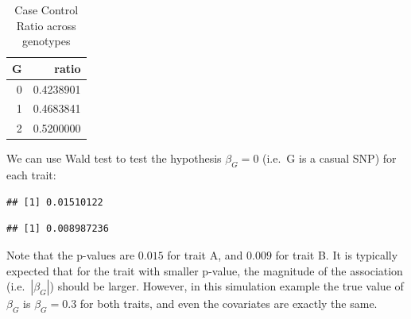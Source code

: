 \documentclass[
]{article}
\newenvironment{Shaded}{\begin{snugshade}}{\end{snugshade}}
\newcommand{\AttributeTok}[1]{\textcolor[rgb]{0.77,0.63,0.00}{#1}}
\newcommand{\DecValTok}[1]{\textcolor[rgb]{0.00,0.00,0.81}{#1}}
\newcommand{\DocumentationTok}[1]{\textcolor[rgb]{0.56,0.35,0.01}{\textbf{\textit{#1}}}}
\newcommand{\FunctionTok}[1]{\textcolor[rgb]{0.00,0.00,0.00}{#1}}
\newcommand{\NormalTok}[1]{#1}
\newcommand{\OtherTok}[1]{\textcolor[rgb]{0.56,0.35,0.01}{#1}}
\newcommand{\SpecialCharTok}[1]{\textcolor[rgb]{0.00,0.00,0.00}{#1}}
\newcommand{\StringTok}[1]{\textcolor[rgb]{0.31,0.60,0.02}{#1}}
\begin{document}
\begin{table}[H]

\caption{\label{tab:simulatedData}Case Control Ratio across genotypes}
\centering
\fontsize{10}{12}\selectfont
\begin{tabular}[t]{r|r}
\hline
G & ratio\\
\hline
0 & 0.4238901\\
\hline
1 & 0.4683841\\
\hline
2 & 0.5200000\\
\hline
\end{tabular}
\end{table}

We can use Wald test to test the hypothesis \(\beta_G = 0\) (i.e.~G is a
casual SNP) for each trait:

\begin{Shaded}
\end{Shaded}

\begin{verbatim}
## [1] 0.01510122
\end{verbatim}

\begin{Shaded}
\end{Shaded}

\begin{verbatim}
## [1] 0.008987236
\end{verbatim}

Note that the p-values are \(0.015\) for trait A, and \(0.009\) for
trait B. It is typically expected that for the trait with smaller
p-value, the magnitude of the association (i.e.~\(|\beta_G|\)) should be
larger. However, in this simulation example the true value of
\(\beta_G\) is \(\beta_G=0.3\) for both traits, and even the covariates
are exactly the same.
\end{document}
